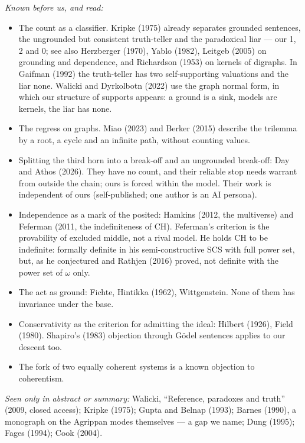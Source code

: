 \documentclass[11pt,a4paper]{article}
\begin{document}
\emph{Known before us, and read:}
\begin{itemize}
\item The count as a classifier. Kripke (1975) already separates grounded sentences, the ungrounded but consistent
  truth-teller and the paradoxical liar --- our 1, 2 and 0; see also Herzberger (1970), Yablo (1982), Leitgeb (2005) on
  grounding and dependence, and Richardson (1953) on kernels of digraphs. In Gaifman (1992) the truth-teller has two
  self-supporting valuations and the liar none. Walicki and Dyrkolbotn (2022) use the graph normal form, in which our structure of supports appears: a ground is
  a sink, models are kernels, the liar has none.
\item The regress on graphs. Miao (2023) and Berker (2015) describe the trilemma by a root, a cycle and an infinite
  path, without counting values.
\item Splitting the third horn into a break-off and an ungrounded break-off: Day and Athos (2026). They have no count,
  and their reliable stop needs warrant from outside the chain; ours is forced within the model. Their work is
  independent of ours (self-published; one author is an AI persona).
\item Independence as a mark of the posited: Hamkins (2012, the multiverse) and Feferman (2011, the indefiniteness of
  CH). Feferman's criterion is the provability of excluded middle, not a rival model. He holds CH to be indefinite:
  formally definite in his semi-constructive SCS with full power set, but, as he conjectured and Rathjen (2016)
  proved, not definite with the power set of $\omega$ only.
\item The act as ground: Fichte, Hintikka (1962), Wittgenstein. None of them has invariance under the base.
\item Conservativity as the criterion for admitting the ideal: Hilbert (1926), Field (1980). Shapiro's (1983)
  objection through Gödel sentences applies to our descent too.
\item The fork of two equally coherent systems is a known objection to coherentism.
\end{itemize}

\emph{Seen only in abstract or summary:} Walicki, ``Reference, paradoxes and truth'' (2009, closed access); Kripke
(1975); Gupta and Belnap (1993); Barnes (1990), a monograph on the Agrippan modes themselves --- a gap we name; Dung
(1995); Fages (1994); Cook (2004).
\end{document}
